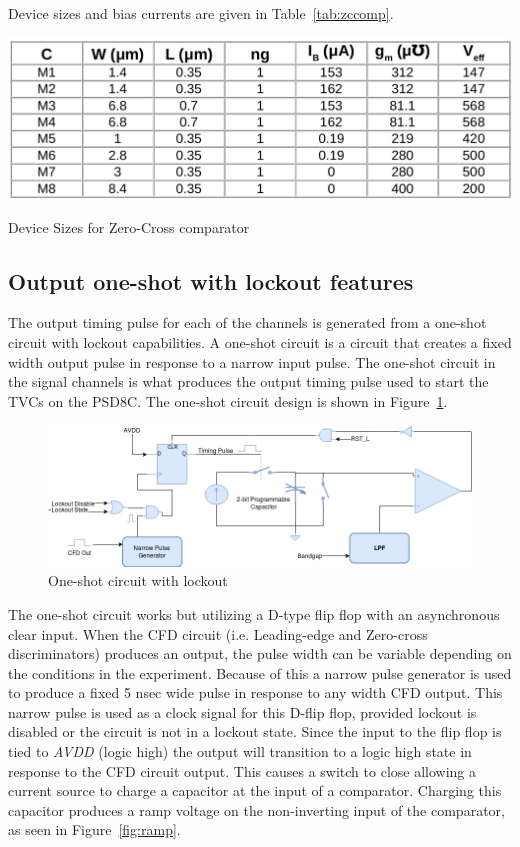 \documentclass[12pt,oneside,final]{siuethesis}
\theoremstyle{definition}
\begin{document}
Device sizes and bias currents are given in Table~\ref{tab:zccomp}.

 \begin{table}[htbp!]
 \centering
 \includegraphics[scale=.35,keepaspectratio=true]{./ch3_figures/zc_cmp_sizes.png}
 \caption{Device Sizes for Zero-Cross comparator}
 \label{tab:zccomp}
\end{table}

\subsection{Output one-shot with lockout features}
\par The output timing pulse for each of the channels is generated from a one-shot circuit with lockout capabilities. A one-shot circuit is a circuit that creates a fixed width output pulse in response to a narrow input pulse. The one-shot circuit in the signal channels is what produces the output timing pulse used to start the TVCs on the PSD8C. The one-shot circuit design is shown in Figure~\ref{fig:oneshot-circuit}.

\begin{figure}[htbp!]
\centering
\includegraphics[scale=.50,keepaspectratio=true]{./ch3_figures/oneshot_circuit.png} 
\caption{One-shot circuit with lockout}
\label{fig:oneshot-circuit}
\end{figure}

\par The one-shot circuit works but utilizing a D-type flip flop with an asynchronous clear input. When the CFD circuit (i.e. Leading-edge and Zero-cross discriminators) produces an output, the pulse width can be variable depending on the conditions in the experiment. Because of this a narrow pulse generator is used to produce a fixed 5 nsec wide pulse in response to any width CFD output. This narrow pulse is used as a clock signal for this D-flip flop, provided lockout is disabled or the circuit is not in a lockout state. Since the input to the flip flop is tied to \emph{AVDD} (logic high) the output will transition to a logic high state in response to the CFD circuit output. This causes a switch to close allowing a current source to charge a capacitor at the input of a comparator. Charging this capacitor produces a ramp voltage on the non-inverting input of the comparator, as seen in Figure~\ref{fig:ramp}.
\end{document}
